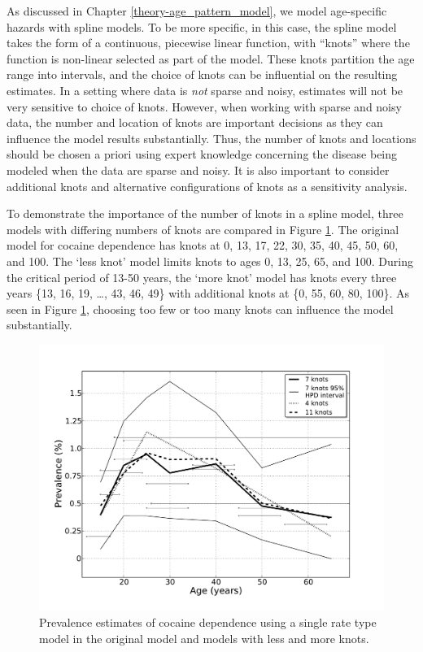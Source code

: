 As discussed in Chapter \ref{theory-age_pattern_model}, we model
age-specific hazards with spline models.  To be more specific, in this
case, the spline model takes the form of a continuous, piecewise
linear function, with ``knots'' where the function is non-linear
selected as part of the model.  These knots partition the age range
into intervals, and the choice of knots can be influential on the
resulting estimates.  In a setting where data is \emph{not} sparse and
noisy, estimates will not be very sensitive to choice of knots.
However, when working with sparse and noisy data, the number and
location of knots are important decisions as they can influence the
model results substantially.  Thus, the number of knots and locations
should be chosen a priori using expert knowledge concerning the
disease being modeled when the data are sparse and noisy.  It is also
important to consider additional knots and alternative configurations
of knots as a sensitivity analysis.

To demonstrate the importance of the number of knots in a spline
model, three models with differing numbers of knots are compared in
Figure \ref{fig:app-cocaine_knots}.  The original model for cocaine
dependence has knots at 0, 13, 17, 22, 30, 35, 40, 45, 50, 60, and
100.  The `less knot' model limits knots to ages 0, 13, 25, 65, and
100.  During the critical period of 13-50 years, the `more knot' model
has knots every three years \{13, 16, 19, \ldots, 43, 46, 49\} with
additional knots at \{0, 55, 60, 80, 100\}.  As seen in Figure
\ref{fig:app-cocaine_knots}, choosing too few or too many knots can
influence the model substantially.

    \begin{figure}[h]
        \begin{center}
            \includegraphics[width=\textwidth]{applications/cocaine_dependence-knots.pdf}
            \caption{Prevalence estimates of cocaine dependence using
              a single rate type model in the original model and
              models with less and more knots. }
        \label{fig:app-cocaine_knots}
        \end{center}
    \end{figure}

